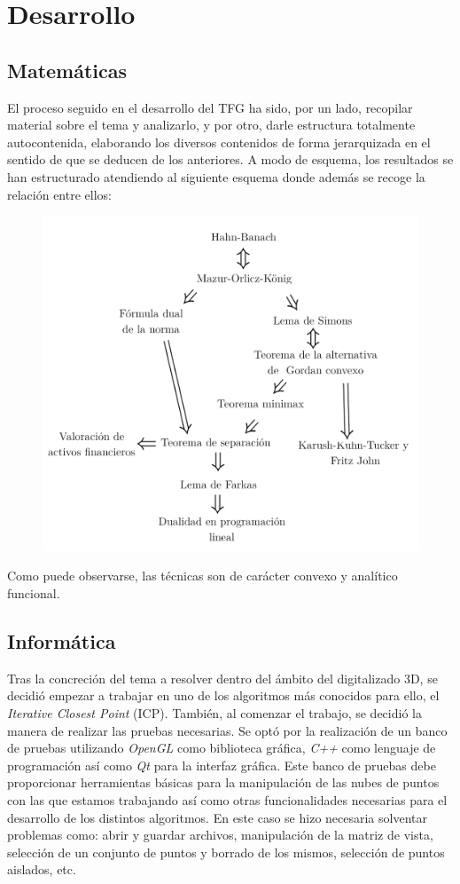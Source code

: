 \chapter{Desarrollo}
\section*{Matemáticas}
El proceso seguido en el desarrollo del TFG ha sido, por un lado, recopilar material sobre el tema y analizarlo, y por otro, darle estructura totalmente autocontenida, elaborando los diversos contenidos de forma jerarquizada en el sentido de que se deducen de los anteriores. A modo de esquema, los resultados se han estructurado atendiendo al siguiente esquema donde además se recoge la relación entre ellos: 
\begin{figure}[h!]
	\centering
	\includegraphics[width=0.9\linewidth]{imagenes/esquema.png}
	\label{fig:aux2}
\end{figure}

Como puede observarse, las técnicas son de carácter convexo y analítico funcional.

\section*{Informática}
Tras la concreción del tema a resolver dentro del ámbito del digitalizado 3D, se decidió empezar a trabajar en uno de los algoritmos más conocidos para ello, el \textit{Iterative Closest Point} (ICP). También, al comenzar el trabajo, se decidió la manera de realizar las pruebas necesarias. Se optó por la realización de un banco de pruebas utilizando \textit{OpenGL} como biblioteca gráfica, \textit{C++} como lenguaje de programación así como \textit{Qt} para la interfaz gráfica. Este banco de pruebas debe proporcionar herramientas básicas para la manipulación de las nubes de puntos con las que estamos trabajando así como otras funcionalidades necesarias para el desarrollo de los distintos algoritmos. En este caso se hizo necesaria solventar problemas como: abrir y guardar archivos, manipulación de la matriz de vista, selección de un conjunto de puntos y borrado de los mismos, selección de puntos aislados, etc.\\

